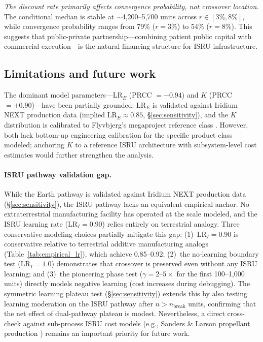 \documentclass[preprint,12pt]{elsarticle}
\begin{document}
\emph{The discount rate primarily affects convergence probability, not crossover location.} The conditional median is stable at $\sim$4{,}200--5{,}700 units across $r \in [3\%, 8\%]$, while convergence probability ranges from 79\% ($r = 3\%$) to 54\% ($r = 8\%$). This suggests that public-private partnership---combining patient public capital with commercial execution---is the natural financing structure for ISRU infrastructure.

\subsection{Limitations and future work}

The dominant model parameters---LR$_E$ (PRCC $= -0.94$) and $K$ (PRCC $= +0.90$)---have been partially grounded: LR$_E$ is validated against Iridium NEXT production data (implied $\mathrm{LR}_E \approx 0.85$, \S\ref{sec:sensitivity}), and the $K$ distribution is calibrated to Flyvbjerg's megaproject reference class \cite{flyvbjerg2014}. However, both lack bottom-up engineering calibration for the specific product class modeled; anchoring $K$ to a reference ISRU architecture with subsystem-level cost estimates would further strengthen the analysis.

\paragraph{ISRU pathway validation gap.} While the Earth pathway is validated against Iridium NEXT production data (\S\ref{sec:sensitivity}), the ISRU pathway lacks an equivalent empirical anchor. No extraterrestrial manufacturing facility has operated at the scale modeled, and the ISRU learning rate ($\mathrm{LR}_I = 0.90$) relies entirely on terrestrial analogy. Three conservative modeling choices partially mitigate this gap: (1)~$\mathrm{LR}_I = 0.90$ is conservative relative to terrestrial additive manufacturing analogs (Table~\ref{tab:empirical_lr}), which achieve 0.85--0.92; (2)~the no-learning boundary test ($\mathrm{LR}_I = 1.0$) demonstrates that crossover is preserved even without any ISRU learning; and (3)~the pioneering phase test ($\gamma = 2$--$5\times$ for the first 100--1{,}000 units) directly models negative learning (cost increases during debugging). The symmetric learning plateau test (\S\ref{sec:sensitivity}) extends this by also testing learning moderation on the ISRU pathway after $n > n_{\mathrm{break}}$ units, confirming that the net effect of dual-pathway plateau is modest. Nevertheless, a direct cross-check against sub-process ISRU cost models (e.g., Sanders \& Larson propellant production \cite{sanders2015}) remains an important priority for future work.
\end{document}
